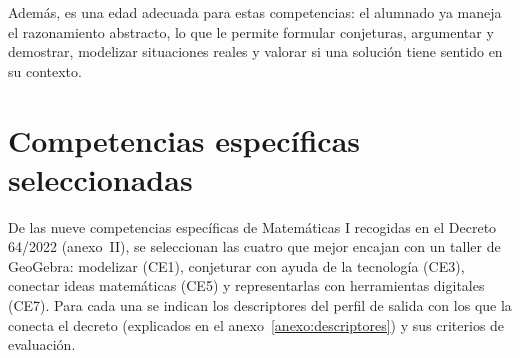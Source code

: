 \documentclass[11pt,a4paper]{article}
\begin{document}
Además, es una edad adecuada para estas competencias: el alumnado ya maneja
el razonamiento abstracto, lo que le permite formular conjeturas, argumentar
y demostrar, modelizar situaciones reales y valorar si una solución tiene
sentido en su contexto.

\section{Competencias específicas seleccionadas}
\label{sec:competencias}
De las nueve competencias específicas de Matemáticas I recogidas en el
Decreto 64/2022 (anexo~II), se seleccionan las cuatro que mejor encajan con un
taller de GeoGebra: modelizar (CE1), conjeturar con ayuda de la tecnología
(CE3), conectar ideas matemáticas (CE5) y representarlas con herramientas
digitales (CE7). Para cada una se indican los descriptores del perfil de
salida con los que la conecta el decreto (explicados en el anexo~\ref{anexo:descriptores}) y sus criterios de evaluación.
\end{document}
